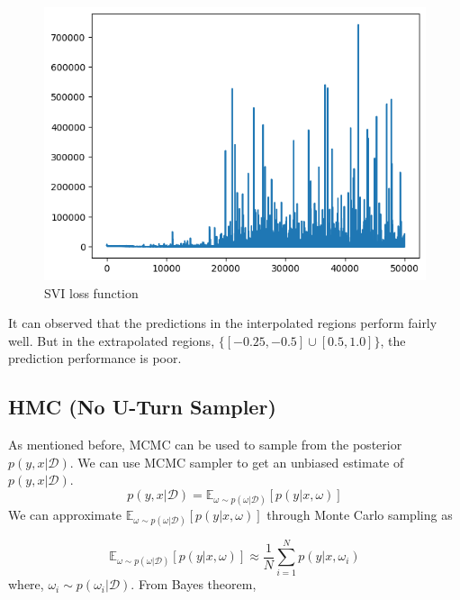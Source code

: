 \documentclass[11pt,a4paper]{article}
\begin{document}
\begin{figure}[h!]
    \centering
    \includegraphics[scale=0.5]{svi loss.png}
    \caption{SVI loss function}
    \label{fig:svi loss function}
\end{figure}

It can observed that the predictions in the interpolated regions perform fairly well. But in the extrapolated regions, $\{[-0.25,-0.5] \cup [0.5,1.0]\}$, the prediction performance is poor. 


\subsection{HMC (No U-Turn Sampler)}
As mentioned before, MCMC can be used to sample from the posterior $p(y,x|\mathcal{D})$. We can use MCMC sampler to get an unbiased estimate of $p(y,x|\mathcal{D})$. \\
\begin{equation}
    p(y,x|\mathcal{D}) = \mathbb{E}_{ \omega \sim p(\omega|\mathcal{D}) }[ p(y|x, \omega) ]
\end{equation}
We can approximate $\mathbb{E}_{ \omega \sim p(\omega|\mathcal{D}) }[ p(y|x, \omega) ]$ through Monte Carlo sampling as

\begin{equation}
    \mathbb{E}_{ \omega \sim p(\omega|\mathcal{D}) }[ p(y|x, \omega) ] \approx \frac{1}{N} \sum_{i=1}^{N} p(y|x, \omega_i)
\end{equation}
where, $\omega_i \sim p(\omega_i| \mathcal{D})$. From Bayes theorem, \\
\end{document}
